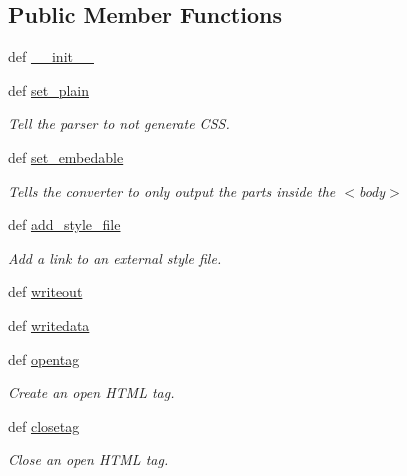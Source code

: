\subsection*{Public Member Functions}
\begin{DoxyCompactItemize}
\item 
def \hyperlink{classodf_1_1odf2xhtml_1_1ODF2XHTML_a3470f2f7b7c9fec62de64e7573d4e2d4}{\+\_\+\+\_\+init\+\_\+\+\_\+}
\item 
def \hyperlink{classodf_1_1odf2xhtml_1_1ODF2XHTML_ad060892881280fe7ac64a3deec144e7b}{set\+\_\+plain}
\begin{DoxyCompactList}\small\item\em Tell the parser to not generate C\+S\+S. \end{DoxyCompactList}\item 
def \hyperlink{classodf_1_1odf2xhtml_1_1ODF2XHTML_ab3791351389857e47900723d500d12ef}{set\+\_\+embedable}
\begin{DoxyCompactList}\small\item\em Tells the converter to only output the parts inside the $<$body$>$ \end{DoxyCompactList}\item 
def \hyperlink{classodf_1_1odf2xhtml_1_1ODF2XHTML_ad7c0d41a99db32946e9dc48c323ff544}{add\+\_\+style\+\_\+file}
\begin{DoxyCompactList}\small\item\em Add a link to an external style file. \end{DoxyCompactList}\item 
def \hyperlink{classodf_1_1odf2xhtml_1_1ODF2XHTML_a56b6eeb4c746b6ba77742d51c660ba57}{writeout}
\item 
def \hyperlink{classodf_1_1odf2xhtml_1_1ODF2XHTML_af625ed9b5834db2c29c991757b601952}{writedata}
\item 
def \hyperlink{classodf_1_1odf2xhtml_1_1ODF2XHTML_aa87e53377636cd62d4adab9c67c6f08a}{opentag}
\begin{DoxyCompactList}\small\item\em Create an open H\+T\+M\+L tag. \end{DoxyCompactList}\item 
def \hyperlink{classodf_1_1odf2xhtml_1_1ODF2XHTML_af4aae69d4d252e3b2f42a6e6eb28ba69}{closetag}
\begin{DoxyCompactList}\small\item\em Close an open H\+T\+M\+L tag. \end{DoxyCompactList}\item 

\end{DoxyCompactItemize}
